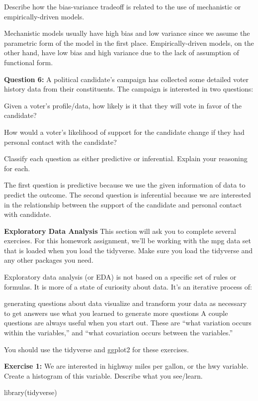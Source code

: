 \documentclass[
]{article}
\newenvironment{Shaded}{\begin{snugshade}}{\end{snugshade}}
\newcommand{\FunctionTok}[1]{\textcolor[rgb]{0.00,0.00,0.00}{#1}}
\newcommand{\NormalTok}[1]{#1}
\begin{document}
Describe how the bias-variance tradeoff is related to the use of
mechanistic or empirically-driven models.

Mechanistic models usually have high bias and low variance since we
assume the parametric form of the model in the first place.
Empirically-driven models, on the other hand, have low bias and high
variance due to the lack of assumption of functional form.

\textbf{Question 6:} A political candidate's campaign has collected some
detailed voter history data from their constituents. The campaign is
interested in two questions:

Given a voter's profile/data, how likely is it that they will vote in
favor of the candidate?

How would a voter's likelihood of support for the candidate change if
they had personal contact with the candidate?

Classify each question as either predictive or inferential. Explain your
reasoning for each.

The first question is predictive because we use the given information of
data to predict the outcome. The second question is inferential because
we are interested in the relationship between the support of the
candidate and personal contact with candidate.

\textbf{Exploratory Data Analysis} This section will ask you to complete
several exercises. For this homework assignment, we'll be working with
the mpg data set that is loaded when you load the tidyverse. Make sure
you load the tidyverse and any other packages you need.

Exploratory data analysis (or EDA) is not based on a specific set of
rules or formulas. It is more of a state of curiosity about data. It's
an iterative process of:

generating questions about data visualize and transform your data as
necessary to get answers use what you learned to generate more questions
A couple questions are always useful when you start out. These are
``what variation occurs within the variables,'' and ``what covariation
occurs between the variables.''

You should use the tidyverse and ggplot2 for these exercises.

\textbf{Exercise 1:} We are interested in highway miles per gallon, or
the hwy variable. Create a histogram of this variable. Describe what you
see/learn.

\begin{Shaded}
\begin{Highlighting}[]
\FunctionTok{library}\NormalTok{(tidyverse)}
\end{Highlighting}
\end{Shaded}
\end{document}
